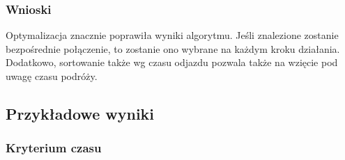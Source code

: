 \documentclass[a4paper, 12pt]{article}
\begin{document}
\subsubsection{Wnioski}
Optymalizacja znacznie poprawiła wyniki algorytmu. 
Jeśli znalezione zostanie bezpośrednie połączenie, to zostanie ono wybrane 
na każdym kroku działania. Dodatkowo, sortowanie także wg czasu odjazdu pozwala
także na wzięcie pod uwagę czasu podróży.


\subsection{Przykładowe wyniki}


\subsubsection{Kryterium czasu}
\end{document}
